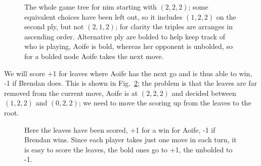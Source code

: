 \documentclass[11pt,a4paper]{scrartcl}
\begin{document}
\begin{figure}
\begin{center}
\end{center}
\caption{The whole game tree for nim starting with $(2,2,2)$; some
  equivalent choices have been left out, so it includes $(1,2,2)$ on
  the second ply, but not $(2,1,2)$; for clarity the triples are
  arranges in ascending order. Alternative ply are bolded to help keep
  track of who is playing, Aoife is bold, whereas her opponent is
  unbolded, so for a bolded node Aoife takes the next
  move. \label{fig:nim}}
\end{figure}


We will score +1 for leaves where Aoife has the next go and is thus
able to win, -1 if Brendan does. This is shown in
Fig.~\ref{fig:nim-leaves}; the problem is that the leaves are far
removed from the current move, Aoife is at $(2,2,2)$ and decided
between $(1,2,2)$ and $(0,2,2)$; we need to move the scoring up from
the leaves to the root.

\begin{figure}
\begin{center}
\end{center}
\caption{Here the leaves have been scored, +1 for a win for Aoife, -1
  if Brendan wins. Since each player takes just one move in each turn,
  it is easy to score the leaves, the bold ones go to +1, the unbolded
  to -1.\label{fig:nim-leaves}}
\end{figure}
\end{document}
